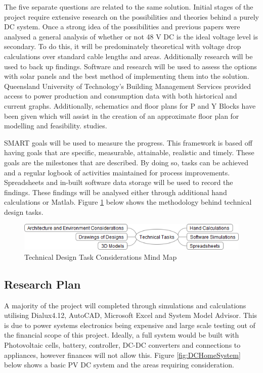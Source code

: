 The five separate questions are related to the same solution. Initial stages of the project require extensive research on the possibilities and theories behind a purely DC system. Once a strong idea of the possibilities and previous papers were analysed a general analysis of whether or not 48 V DC is the ideal voltage level is secondary. To do this, it will be predominately theoretical with voltage drop calculations over standard cable lengths and areas. Additionally research will be used to back up findings. Software and research will be used to assess the options with solar panels and the best method of implementing them into the solution. Queensland University of Technology's Building Management Services provided access to power production and consumption data with both historical and current graphs. Additionally, schematics and floor plans for P and Y Blocks have been given which will assist in the creation of an approximate floor plan for modelling and feasibility. studies.   
\newline

SMART goals will be used to measure the progress. This framework is based off having goals that are specific, measurable, attainable, realistic and timely. These goals are the milestones that are described. By doing so, tasks can be achieved and a regular logbook of activities maintained for process improvements. Spreadsheets and in-built software data storage will be used to record the findings. These findings will be analysed either through additional hand calculations or Matlab. Figure \ref{fig:PracProcedure} below shows the methodology behind technical design tasks.    

\begin{figure}[H]
\hfill\includegraphics[width = 160mm]{images/Practical_Planning_Rev2}\hspace*{\fill}
\caption{Technical Design Task Considerations Mind Map}
\label{fig:PracProcedure}
\end{figure}     

\newpage

\subsection{Research Plan}

A majority of the project will completed through simulations and calculations utilising Dialux4.12, AutoCAD, Microsoft Excel and System Model Advisor. This is due to power systems electronics being expensive and large scale testing out of the financial scope of this project. Ideally, a full system would be built with Photovoltaic cells, battery, controller, DC-DC converters and connections to appliances, however finances will not allow this. Figure \ref{fig:DCHomeSystem} below shows a basic PV DC system and the areas requiring consideration. 
\newline

